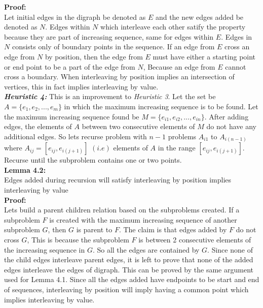 \documentclass[BTech]{iitmdiss}
\begin{document}
\textbf{Proof:}\\
Let initial edges in the digraph be denoted as $E$ and the new edges added be denoted as $N$. Edges within $N$ which interleave each other satify the property because they are part of increasing sequence, same for edges within $E$. Edges in $N$ consists only of boundary points in the sequence. If an edge from $E$ cross an edge from $N$ by position, then the edge from $E$ must have either a starting point or end point to be a part of the edge from $N$, Because an edge from $E$ cannot cross a boundary. When interleaving by position implies an intersection of vertices, this in fact implies interleaving by value.\\
\textit{\textbf{Heuristic 4:}} This is an improvement to \textit{Heuristic 3}. Let the set be $A = \{e_1,e_2,...,e_m\}$ in which the maximum increasing sequence is to be found. Let the maximum increasing sequence found be $M = \{e_{i1},e_{i2},...,e_{in}\}$. After adding edges, the elements of $A$ between two consecutive elements of $M$ do not have any additional edges. So lets recurse problem with $n-1$ problems $A_{i1}$ to $A_{i(n-1)}$ where $A_{ij} = [e_{ij},e_{i(j+1)}]$ $(i.e)$ elements of $A$ in the range $[e_{ij},e_{i(j+1)}]$. Recurse until the subproblem contains one or two points.\\
\textbf{Lemma 4.2:}\\ Edges added during recursion will satisfy interleaving by position implies interleaving by value\\
\textbf{Proof:}\\
Lets build a parent children relation based on the subproblems created. If a subproblem $F$ is created with the maximum increasing sequence of another subproblem $G$, then $G$ is parent to $F$. The claim is that edges added by $F$ do not cross $G$, This is because the subproblem $F$ is between 2 consecutive elements of the increasing sequence in $G$. So all the edges are contained by $G$. Since none of the child edges interleave parent edges, it is left to prove that none of the added edges interleave the edges of digraph. This can be proved by the same argument used for Lemma 4.1. Since all the edges added have endpoints to be start and end of sequences, interleaving by position will imply having a common point which implies interleaving by value.
\end{document}
